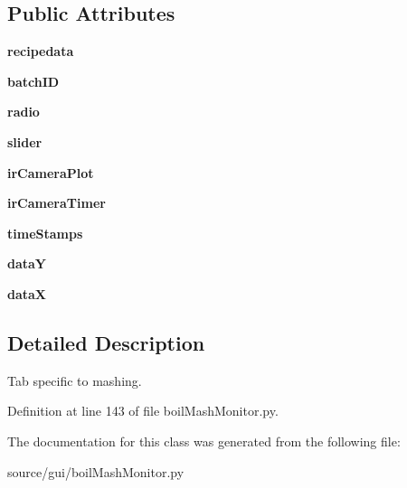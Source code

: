 \subsection*{Public Attributes}
\begin{DoxyCompactItemize}
\item 
\mbox{\label{classboil_mash_monitor_1_1_tab_mash_af73d9d385de8cdc7780ee08854cfa242}} 
{\bfseries recipedata}
\item 
\mbox{\label{classboil_mash_monitor_1_1_tab_mash_a541ec5df0545115b4277b4f837ad2bbf}} 
{\bfseries batch\+ID}
\item 
\mbox{\label{classboil_mash_monitor_1_1_tab_mash_ad0141bbca9b738557f23b804324b8c55}} 
{\bfseries radio}
\item 
\mbox{\label{classboil_mash_monitor_1_1_tab_mash_ad7c3356e5b8b7ebcea8a50ff6ab89ceb}} 
{\bfseries slider}
\item 
\mbox{\label{classboil_mash_monitor_1_1_tab_mash_a20bdb44999e6dd1dd3b14e038eba5fa7}} 
{\bfseries ir\+Camera\+Plot}
\item 
\mbox{\label{classboil_mash_monitor_1_1_tab_mash_a3959020b5317a695306956ad0413cb8c}} 
{\bfseries ir\+Camera\+Timer}
\item 
\mbox{\label{classboil_mash_monitor_1_1_tab_mash_ad638a4ec1b0558000c46372eb949b5cd}} 
{\bfseries time\+Stamps}
\item 
\mbox{\label{classboil_mash_monitor_1_1_tab_mash_a4b62f79ea2d4a50b67b28aac09e3cd3c}} 
{\bfseries dataY}
\item 
\mbox{\label{classboil_mash_monitor_1_1_tab_mash_a6bc98abfe4602c38ff4882da335344d0}} 
{\bfseries dataX}
\end{DoxyCompactItemize}


\subsection{Detailed Description}
Tab specific to mashing. 

Definition at line 143 of file boil\+Mash\+Monitor.\+py.



The documentation for this class was generated from the following file\+:\begin{DoxyCompactItemize}
\item 
source/gui/boil\+Mash\+Monitor.\+py\end{DoxyCompactItemize}
